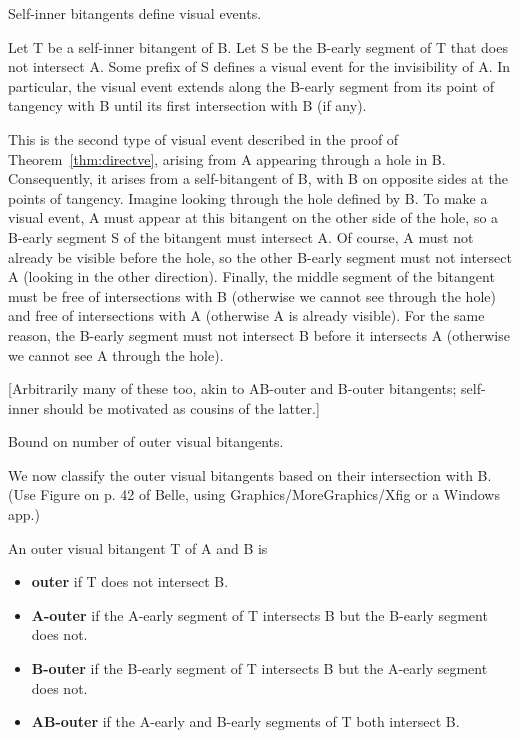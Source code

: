 \documentclass[12pt]{article}
\begin{document}
Self-inner bitangents define visual events.

\begin{theorem}
Let T be a self-inner bitangent of B.
Let S be the B-early segment of T that does not intersect A.
Some prefix of S defines a visual event for the invisibility of A.
In particular, the visual event extends along the B-early segment
from its point of tangency with B until its first intersection with B (if any).
\end{theorem}
\prf
This is the second type of visual event described in the proof of 
Theorem~\ref{thm:directve},
arising from A appearing through a hole in B.
Consequently, it arises from a self-bitangent of B, with B on opposite sides
at the points of tangency.
Imagine looking through the hole defined by B.
To make a visual event, A must appear at this bitangent on the other side of the hole,
so a B-early segment S of the bitangent must intersect A.
Of course, A must not already be visible before the hole, so
the other B-early segment must not intersect A (looking in the other direction).
Finally, the middle segment of the bitangent must be free of intersections with B
(otherwise we cannot see through the hole) and free of intersections with A
(otherwise A is already visible).
For the same reason, the B-early segment must not intersect B before it intersects A
(otherwise we cannot see A through the hole).
\QED

[Arbitrarily many of these too, akin to AB-outer and B-outer bitangents;
self-inner should be motivated as cousins of the latter.]

\clearpage

\begin{lemma}
Bound on number of outer visual bitangents.
\end{lemma}

We now classify the outer visual bitangents based on their intersection with B.
(Use Figure on p. 42 of Belle, using Graphics/MoreGraphics/Xfig or a Windows app.)

\begin{defn2}
An outer visual bitangent T of A and B is 
\begin{itemize}
\item {\bf outer} if T does not intersect B.
\item {\bf A-outer} if the A-early segment of T intersects B
      but the B-early segment does not.
\item {\bf B-outer} if the B-early segment of T intersects B
      but the A-early segment does not.
\item {\bf AB-outer} if the A-early and B-early segments of T both intersect B.
\end{itemize}
\end{defn2}
\end{document}
